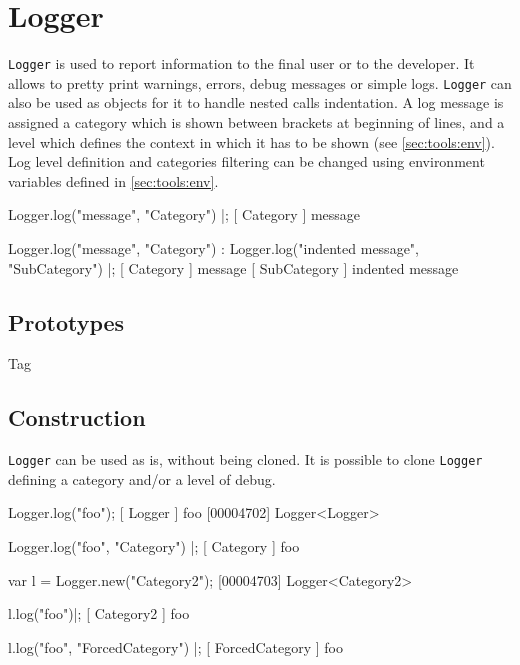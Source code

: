 
\section{Logger}

\lstinline|Logger| is used to report information to the final user or to the
developer. It allows to pretty print warnings, errors, debug messages or
simple logs. \lstinline|Logger| can also be used as  objects
for it to handle nested calls indentation. A log message is assigned a
category which is shown between brackets at beginning of lines, and a level
which defines the context in which it has to be shown (see
\autoref{sec:tools:env}). Log level definition and categories filtering can
be changed using environment variables defined in \autoref{sec:tools:env}.

\begin{urbiscript}
Logger.log("message", "Category") |;
[       Category        ] message

Logger.log("message", "Category") :
{
  Logger.log("indented message", "SubCategory")
}|;
[       Category        ] message
[      SubCategory      ]   indented message
\end{urbiscript}

\subsection{Prototypes}
\begin{refObjects}
\item[Tag]
\end{refObjects}

\subsection{Construction}

\lstinline|Logger| can be used as is, without being cloned. It is possible
to clone \lstinline|Logger| defining a category and/or a level of debug.

\begin{urbiscript}
Logger.log("foo");
[        Logger         ] foo
[00004702] Logger<Logger>

Logger.log("foo", "Category") |;
[       Category        ] foo

var l = Logger.new("Category2");
[00004703] Logger<Category2>

l.log("foo")|;
[       Category2       ] foo

l.log("foo", "ForcedCategory") |;
[    ForcedCategory     ] foo
\end{urbiscript}

